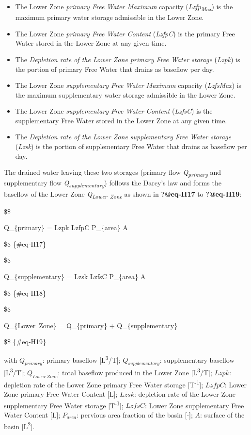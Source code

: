 \documentclass[
  letterpaper,
  DIV=11,
  numbers=noendperiod]{scrreprt}
\begin{document}
\begin{itemize}
\item
  The Lower Zone \emph{primary Free Water Maximum} capacity
  (\emph{Lzfp\textsubscript{Max}}) is the maximum primary water storage
  admissible in the Lower Zone.
\item
  The Lower Zone \emph{primary Free Water Content} (\emph{LzfpC}) is the
  primary Free Water stored in the Lower Zone at any given time.
\item
  The \emph{Depletion rate of the Lower Zone primary Free Water storage}
  (\emph{Lzpk}) is the portion of primary Free Water that drains as
  baseflow per day.
\item
  The Lower Zone \emph{supplementary Free Water Maximum} capacity
  (\emph{LzfsMax}) is the maximum supplementary water storage admissible
  in the Lower Zone.
\item
  The Lower Zone \emph{supplementary Free Water Content} (\emph{LzfsC})
  is the supplementary Free Water stored in the Lower Zone at any given
  time.
\item
  The \emph{Depletion rate of the Lower Zone supplementary Free Water
  storage} (\emph{Lzsk}) is the portion of supplementary Free Water that
  drains as baseflow per day.
\end{itemize}

The drained water leaving these two storages (primary flow
\emph{Q\textsubscript{primary}} and supplementary flow
\emph{Q\textsubscript{supplementary}}) follows the Darcy's law and forms
the baseflow of the Lower Zone \emph{Q\textsubscript{Lower~Zone}} as
shown in \textbf{?@eq-H17} to \textbf{?@eq-H19}:

\$\$

Q\_\{primary\} = Lzpk \cdot LzfpC \cdot P\_\{area\} \cdot A

\$\$ \{\#eq-H17\}

\$\$

Q\_\{supplementary\} = Lzsk \cdot LzfsC \cdot P\_\{area\} \cdot A

\$\$ \{\#eq-H18\}

\$\$

Q\_\{Lower~Zone\} = Q\_\{primary\} + Q\_\{supplementary\}

\$\$ \{\#eq-H19\}

with \(Q_{primary}\): primary baseflow {[}L\textsuperscript{3}/T{]};
\(Q_{supplementary}\): supplementary baseflow
{[}L\textsuperscript{3}/T{]}; \(Q_{Lower\ Zone}\): total baseflow
produced in the Lower Zone {[}L\textsuperscript{3}/T{]}; \(Lzpk\):
depletion rate of the Lower Zone primary Free Water storage
{[}T\textsuperscript{-1}{]}; \(LzfpC\): Lower Zone primary Free Water
Content {[}L{]}; \(Lzsk\): depletion rate of the Lower Zone
supplementary Free Water storage {[}T\textsuperscript{-1}{]}; \(LzfsC\):
Lower Zone supplementary Free Water Content {[}L{]}; \(P_{area}\):
pervious area fraction of the basin {[}-{]}; \(A\): surface of the basin
{[}L\textsuperscript{2}{]}.
\end{document}
